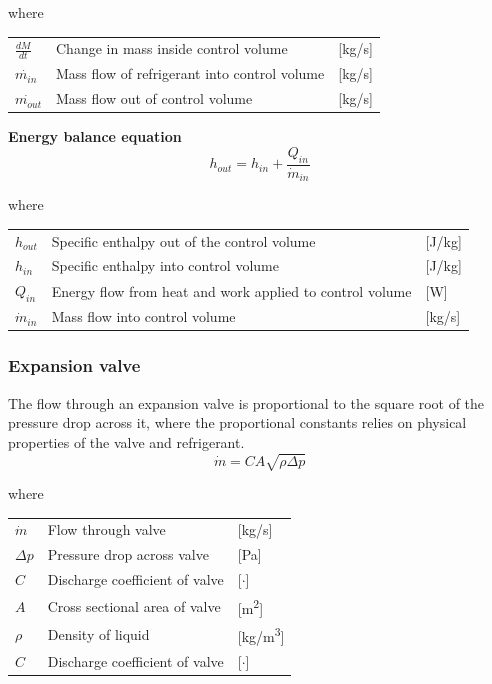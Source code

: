 where
\begin{center}
	\begin{tabular}{l p{8cm} l}
		$\frac{dM}{dt}$ 	& Change in mass inside control volume & [\si{kg}/\si{s}]\\
		$\dot{m_{in}}$ 		& Mass flow of refrigerant into control volume & [\si{kg}/\si{s}]\\
		$\dot{m_{out}}$ 	& Mass flow out of control volume & [\si{kg}/\si{s}]\\
	\end{tabular}
\end{center}

\textbf{Energy balance equation}
\begin{equation}
	h_{out} = h_{in} + \frac{Q_{in}}{\dot{m}_{in}}
\end{equation}

where
\begin{center}
	\begin{tabular}{l p{8cm} l}
		$h_{out}$ 		& Specific enthalpy out of the control volume & [\si{J}/\si{kg}]\\
		$h_{in}$ 		& Specific enthalpy into control volume & [\si{J}/\si{kg}]\\
		$Q_{in}$ 		& Energy flow from heat and work applied to control volume & [\si{W}]\\
		$\dot{m}_{in}$ 	& Mass flow into control volume & [\si{kg}/\si{s}]\\
	\end{tabular}
\end{center}

\subsubsection{Expansion valve}
The flow through an expansion valve is proportional to the square root of the pressure drop across it, where the proportional constants relies on physical properties of the valve and refrigerant.
\begin{equation} \label{eq:ExpansionValve}
	\dot{m}= C A \sqrt{\rho\Delta p}
\end{equation}

where
\begin{center}
	\begin{tabular}{l p{8cm} l}
		$\dot{m}$ 	& Flow through valve & [\si{kg}/\si{s}]\\
		$\Delta p$ 	& Pressure drop across valve & [\si{Pa}]\\
		$C$ 		& Discharge coefficient of valve & [$\cdot$]\\
		$A$	 		& Cross sectional area of valve & [\si{m^2}]\\
		$\rho$ 		& Density of liquid & [\si{kg}/\si{m^3}]\\
			$C$ 	& Discharge coefficient of valve & [$\cdot$]\\
	\end{tabular}
\end{center}

